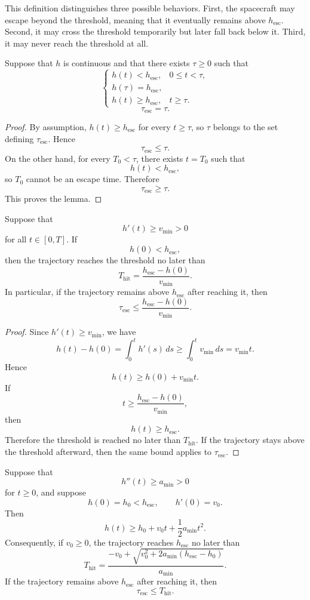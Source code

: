 This definition distinguishes three possible behaviors. 
First, the spacecraft may escape beyond the threshold, meaning that it eventually remains above $h_{\mathrm{esc}}$. 
Second, it may cross the threshold temporarily but later fall back below it. 
Third, it may never reach the threshold at all.
\begin{lemma}
Suppose that $h$ is continuous and that there exists $\tau\geq 0$ such that
\[
\begin{cases}
    h(t)<h_{\mathrm{esc}}, & 0\leq t<\tau,\\
    h(\tau)=h_{\mathrm{esc}},\\
    h(t)\geq h_{\mathrm{esc}}, & t\geq \tau.
\end{cases}
\]
\[
    \tau_{\mathrm{esc}}=\tau.
\]
\end{lemma}
\begin{proof}
By assumption, $h(t)\geq h_{\mathrm{esc}}$ for every $t\geq \tau$, so $\tau$ belongs to the set defining $\tau_{\mathrm{esc}}$. Hence
\[
    \tau_{\mathrm{esc}}\leq \tau.
\]
On the other hand, for every $T_0<\tau$, there exists $t=T_0$ such that
\[
    h(t)<h_{\mathrm{esc}},
\]
so $T_0$ cannot be an escape time. Therefore
\[
    \tau_{\mathrm{esc}}\geq \tau.
\]
This proves the lemma.
\end{proof}
\begin{lemma}
Suppose that
\[
    h'(t)\geq v_{\min}>0
\]
for all $t\in[0,T]$. If
\[
    h(0)<h_{\mathrm{esc}},
\]
then the trajectory reaches the threshold no later than
\[
    T_{\mathrm{hit}} = \frac{h_{\mathrm{esc}}-h(0)}{v_{\min}}.
\]
In particular, if the trajectory remains above $h_{\mathrm{esc}}$ after reaching it, then
\[
    \tau_{\mathrm{esc}} \leq \frac{h_{\mathrm{esc}}-h(0)}{v_{\min}}.
\]
\end{lemma}
\begin{proof}
Since $h'(t)\geq v_{\min}$, we have
\[
    h(t)-h(0) = \int_0^t h'(s)\,ds \geq \int_0^t v_{\min}\,ds = v_{\min}t.
\]
Hence
\[
    h(t)\geq h(0)+v_{\min}t.
\]
If
\[
    t\geq \frac{h_{\mathrm{esc}}-h(0)}{v_{\min}},
\]
then
\[
    h(t)\geq h_{\mathrm{esc}}.
\]
Therefore the threshold is reached no later than $T_{\mathrm{hit}}$. 
If the trajectory stays above the threshold afterward, then the same bound applies to $\tau_{\mathrm{esc}}$.
\end{proof}
\begin{lemma}
Suppose that
\[
    h''(t)\geq a_{\min}>0
\]
for $t\geq 0$, and suppose
\[
    h(0)=h_0<h_{\mathrm{esc}},\qquad h'(0)=v_0.
\]
Then
\[
    h(t)\geq h_0+v_0t+\frac12a_{\min}t^2.
\]
Consequently, if $v_0\geq 0$, the trajectory reaches $h_{\mathrm{esc}}$ no later than
\[
    T_{\mathrm{hit}} = \frac{ -v_0+\sqrt{v_0^2+2a_{\min}(h_{\mathrm{esc}}-h_0)} }{a_{\min}}.
\]
If the trajectory remains above $h_{\mathrm{esc}}$ after reaching it, then
\[
    \tau_{\mathrm{esc}}\leq T_{\mathrm{hit}}.
\]
\end{lemma}
